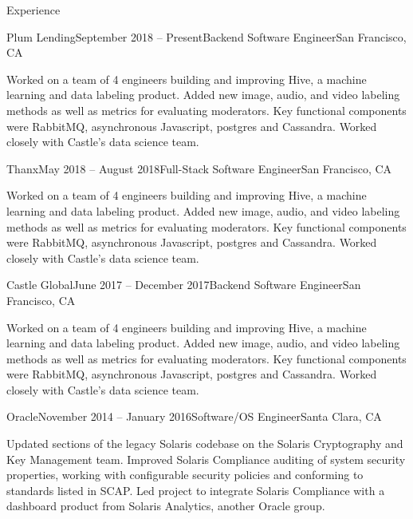 \documentclass{resume} %
\begin{document}

\begin{rSection}{Experience}

\begin{rSubsection}{Plum Lending}{September 2018 -- Present}{Backend Software Engineer}{San Francisco, CA}
\item Worked on a team of 4 engineers building and improving Hive, a machine learning and data labeling product. Added new image, audio, and video labeling methods as well as metrics for evaluating moderators. Key functional components were RabbitMQ, asynchronous Javascript, postgres and Cassandra. Worked closely with Castle's data science team.
\end{rSubsection}

\begin{rSubsection}{Thanx}{May 2018 -- August 2018}{Full-Stack Software Engineer}{San Francisco, CA}
\item Worked on a team of 4 engineers building and improving Hive, a machine learning and data labeling product. Added new image, audio, and video labeling methods as well as metrics for evaluating moderators. Key functional components were RabbitMQ, asynchronous Javascript, postgres and Cassandra. Worked closely with Castle's data science team.
\end{rSubsection}

\begin{rSubsection}{Castle Global}{June 2017 -- December 2017}{Backend Software Engineer}{San Francisco, CA}
\item Worked on a team of 4 engineers building and improving Hive, a machine learning and data labeling product. Added new image, audio, and video labeling methods as well as metrics for evaluating moderators. Key functional components were RabbitMQ, asynchronous Javascript, postgres and Cassandra. Worked closely with Castle's data science team.
\end{rSubsection}

\begin{rSubsection}{Oracle}{November 2014 -- January 2016}{Software/OS Engineer}{Santa Clara, CA}
\item Updated sections of the legacy Solaris codebase on the Solaris Cryptography and Key Management team. Improved Solaris Compliance auditing of system security properties, working with configurable security policies and conforming to standards listed in SCAP. Led project to integrate Solaris Compliance with a dashboard product from Solaris Analytics, another Oracle group. 
\end{rSubsection}


\end{rSection}
\end{document}
